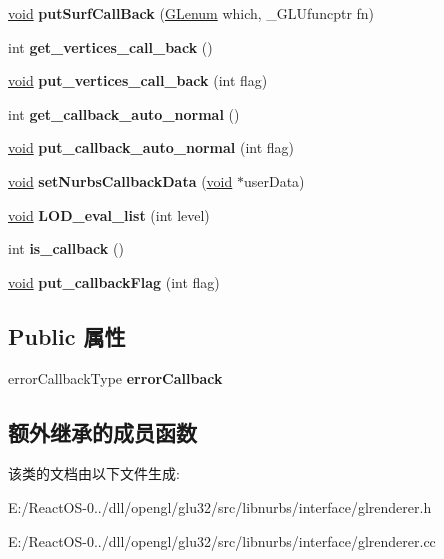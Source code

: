\begin{DoxyCompactItemize}
\mbox{\label{class_g_l_unurbs_a30496cca70d0992a08b6f54dd5e85ceb}} 
\hyperlink{interfacevoid}{void} {\bfseries put\+Surf\+Call\+Back} (\hyperlink{interfacevoid}{G\+Lenum} which, \+\_\+\+G\+L\+Ufuncptr fn)
\item 
\mbox{\label{class_g_l_unurbs_afae0bf93f98ddc1eb7658f18686a282a}} 
int {\bfseries get\+\_\+vertices\+\_\+call\+\_\+back} ()
\item 
\mbox{\label{class_g_l_unurbs_af4771c43701f3e071fa13bf541583e71}} 
\hyperlink{interfacevoid}{void} {\bfseries put\+\_\+vertices\+\_\+call\+\_\+back} (int flag)
\item 
\mbox{\label{class_g_l_unurbs_a8872894c74490e755e7064fbd121dff1}} 
int {\bfseries get\+\_\+callback\+\_\+auto\+\_\+normal} ()
\item 
\mbox{\label{class_g_l_unurbs_a0694af48fb2c53e307a7621d3b11e832}} 
\hyperlink{interfacevoid}{void} {\bfseries put\+\_\+callback\+\_\+auto\+\_\+normal} (int flag)
\item 
\mbox{\label{class_g_l_unurbs_a91e0405872a19f2dced726be2346a6b2}} 
\hyperlink{interfacevoid}{void} {\bfseries set\+Nurbs\+Callback\+Data} (\hyperlink{interfacevoid}{void} $\ast$user\+Data)
\item 
\mbox{\label{class_g_l_unurbs_a815ac7f5fbde130f1194bbd67fb20b12}} 
\hyperlink{interfacevoid}{void} {\bfseries L\+O\+D\+\_\+eval\+\_\+list} (int level)
\item 
\mbox{\label{class_g_l_unurbs_a397e90e869db026de876b9ac7604b08e}} 
int {\bfseries is\+\_\+callback} ()
\item 
\mbox{\label{class_g_l_unurbs_ab0ede1622ef7ee3bbd7cca3fd86e4c2d}} 
\hyperlink{interfacevoid}{void} {\bfseries put\+\_\+callback\+Flag} (int flag)
\end{DoxyCompactItemize}
\subsection*{Public 属性}
\begin{DoxyCompactItemize}
\item 
\mbox{\label{class_g_l_unurbs_a5abd4ec29447c675197232f1592e47f0}} 
error\+Callback\+Type {\bfseries error\+Callback}
\end{DoxyCompactItemize}
\subsection*{额外继承的成员函数}


该类的文档由以下文件生成\+:\begin{DoxyCompactItemize}
\item 
E\+:/\+React\+O\+S-\/0../dll/opengl/glu32/src/libnurbs/interface/glrenderer.\+h\item 
E\+:/\+React\+O\+S-\/0../dll/opengl/glu32/src/libnurbs/interface/glrenderer.\+cc\end{DoxyCompactItemize}
